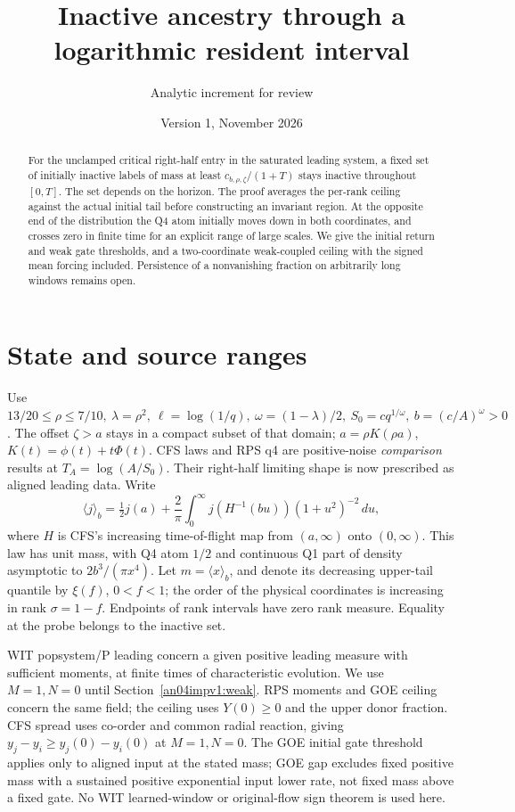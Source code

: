 \documentclass[11pt]{article}
\title{Inactive ancestry through a logarithmic resident interval}
\author{Analytic increment for review}\date{Version 1, November 2026}
\newcommand{\dd}{\,d}\newcommand{\E}{\mathbb E}
\begin{document}
\maketitle
\begin{abstract}
For the unclamped critical right-half entry in the saturated leading
system, a fixed set of initially inactive labels of mass at least
\(c_{b,\rho,\zeta}/(1+T)\) stays inactive throughout \([0,T]\).
The set depends on the horizon. The proof averages the per-rank ceiling
against the actual initial tail before constructing an invariant region.
At the opposite end of the distribution the Q4 atom initially moves
down in both coordinates, and crosses zero in finite time for an
explicit range of large scales. We give the initial return and weak
gate thresholds, and a two-coordinate weak-coupled ceiling with the
signed mean forcing included. Persistence of a nonvanishing fraction
on arbitrarily long windows remains open.
\end{abstract}

\section{State and source ranges}\label{an04impv1:scope}
Use \(13/20\le\rho\le7/10,\ \lambda=\rho^2,\ \ell=\log(1/q),\
\omega=(1-\lambda)/2,\ S_0=cq^{1/\omega},\ b=(c/A)^\omega>0\).
The offset \(\zeta>a\) stays in a compact subset of that domain;
\(a=\rho K(\rho a)\), \(K(t)=\phi(t)+t\Phi(t)\).
CFS laws and RPS q4 are positive-noise \emph{comparison} results
at \(T_A=\log(A/S_0)\). Their right-half limiting shape is now
prescribed as aligned leading data. Write
\[
 \langle j\rangle_b=\tfrac12j(a)+\frac2\pi\int_0^\infty
         j(H^{-1}(bu))(1+u^2)^{-2}\dd u,
\]
where \(H\) is CFS's increasing time-of-flight map from \((a,\infty)\)
onto \((0,\infty)\). This law has unit mass, with Q4 atom \(1/2\)
and continuous Q1 part of density asymptotic to \(2b^3/(\pi x^4)\).
Let \(m=\langle x\rangle_b\), and denote its decreasing upper-tail
quantile by \(\xi(f)\), \(0<f<1\); the order of the physical coordinates
is increasing in rank \(\sigma=1-f\). Endpoints of rank intervals
have zero rank measure. Equality at the probe belongs to the inactive set.

WIT popsystem/P leading concern a given positive leading measure with
sufficient moments, at finite times of characteristic evolution. We use
\(M=1,N=0\) until Section~\ref{an04impv1:weak}. RPS moments and
GOE ceiling concern the same field; the ceiling uses \(Y(0)\ge0\)
and the upper donor fraction. CFS spread uses co-order and common
radial reaction, giving \(y_j-y_i\ge y_j(0)-y_i(0)\) at \(M=1,N=0\).
The GOE initial gate threshold applies only to aligned input at the
stated mass; GOE gap excludes fixed positive mass with a sustained
positive exponential input lower rate, not fixed mass above a fixed gate.
No WIT learned-window or original-flow sign theorem is used here.
\end{document}
